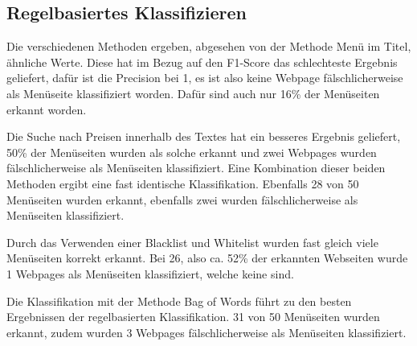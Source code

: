 \subsection{Regelbasiertes Klassifizieren}

Die verschiedenen Methoden ergeben, abgesehen von der Methode \glqq Menü im Titel\grqq{}, ähnliche Werte.
Diese hat im Bezug auf den F1-Score das schlechteste Ergebnis geliefert, dafür ist die Precision bei 1, es ist also keine Webpage fälschlicherweise als Menüseite klassifiziert worden.
Dafür sind auch nur 16\% der Menüseiten erkannt worden.

Die Suche nach Preisen innerhalb des Textes hat ein besseres Ergebnis geliefert, 50\% der Menüseiten wurden als solche erkannt und zwei Webpages wurden fälschlicherweise als Menüseiten klassifiziert. 
Eine Kombination dieser beiden Methoden ergibt eine fast identische Klassifikation.
Ebenfalls 28 von 50 Menüseiten wurden erkannt, ebenfalls zwei wurden fälschlicherweise als Menüseiten klassifiziert.

Durch das Verwenden einer Blacklist und Whitelist wurden fast gleich viele Menüseiten korrekt erkannt. Bei 26, also ca. 52\% der erkannten Webseiten wurde 1 Webpages als Menüseiten klassifiziert, welche keine sind.

Die Klassifikation mit der Methode \glqq Bag of Words\grqq{} führt zu den besten Ergebnissen der regelbasierten Klassifikation.
31 von 50 Menüseiten wurden erkannt, zudem wurden 3 Webpages fälschlicherweise als Menüseiten klassifiziert.

